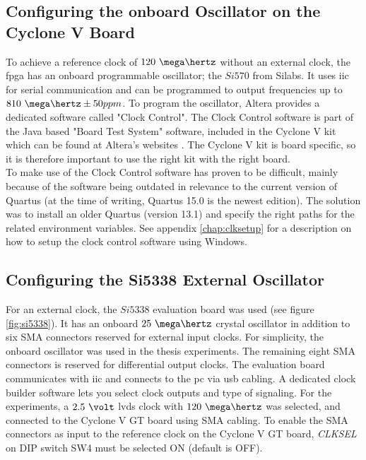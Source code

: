 \documentclass[main.tex]{subfiles}
\begin{document}
\subsection{Configuring the onboard Oscillator on the Cyclone V Board} \label{sec:inclk}

To achieve a reference clock of $120~\mega\hertz$ without an external clock, the \gls{fpga} has an onboard programmable oscillator; the $Si570$ from Silabs. It uses \gls{iic} for serial communication and can be programmed to output frequencies up to $810~\mega\hertz \pm 50 ppm$. To program the oscillator, Altera provides a dedicated software called "Clock Control". The Clock Control software is part of the Java based "Board Test System" software, included in the Cyclone V kit which can be found at Altera's websites \cite{altera_cyclonekit}. The Cyclone V kit is board specific, so it is therefore important to use the right kit with the right board.\\

To make use of the Clock Control software has proven to be difficult, mainly because of the software being outdated in relevance to the current version of Quartus (at the time of writing, Quartus 15.0 is the newest edition). The solution was to install an older Quartus (version 13.1) and specify the right paths for the related environment variables. See appendix \ref{chap:clksetup} for a description on how to setup the clock control software using Windows.

\subsection{Configuring the Si5338 External Oscillator} \label{sec:exclk}

For an external clock, the $Si5338$ evaluation board was used (see figure \ref{fig:si5338}). It has an onboard $25~\mega\hertz$ crystal oscillator in addition to six SMA connectors reserved for external input clocks. For simplicity, the onboard oscillator was used in the thesis experiments. The remaining eight SMA connectors is reserved for differential output clocks. The evaluation board communicates with \gls{iic} and connects to the \gls{pc} via \gls{usb} cabling. A dedicated clock builder software \cite{siclk} lets you select clock outputs and type of signaling. For the experiments, a $2.5~\volt$ \gls{lvds} clock with $120~\mega\hertz$ was selected, and connected to the Cyclone V GT board using SMA cabling. To enable the SMA connectors as input to the reference clock on the Cyclone V GT board, \textit{CLKSEL} on DIP switch SW4 must be selected ON (default is OFF).
\end{document}
